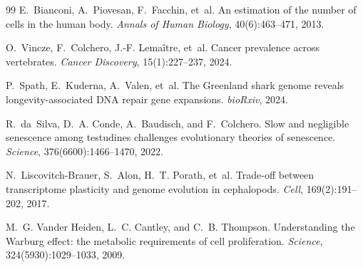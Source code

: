 \documentclass[11pt]{article}
\theoremstyle{definition}
\begin{document}
\begin{thebibliography}{99}
E.~Bianconi, A.~Piovesan, F.~Facchin, et~al.
\newblock An estimation of the number of cells in the human body.
\newblock \emph{Annals of Human Biology}, 40(6):463--471, 2013.

O.~Vincze, F.~Colchero, J.-F. Lema\^itre, et~al.
\newblock Cancer prevalence across vertebrates.
\newblock \emph{Cancer Discovery}, 15(1):227--237, 2024.

P.~Spath, E.~Kuderna, A.~Valen, et~al.
\newblock The Greenland shark genome reveals longevity-associated
DNA repair gene expansions.
\newblock \emph{bioRxiv}, 2024.

R.~da~Silva, D.~A. Conde, A.~Baudisch, and F.~Colchero.
\newblock Slow and negligible senescence among testudines challenges
evolutionary theories of senescence.
\newblock \emph{Science}, 376(6600):1466--1470, 2022.

N.~Liscovitch-Brauer, S.~Alon, H.~T. Porath, et~al.
\newblock Trade-off between transcriptome plasticity and genome evolution in
cephalopods.
\newblock \emph{Cell}, 169(2):191--202, 2017.

M.~G. {Vander Heiden}, L.~C. Cantley, and C.~B. Thompson.
\newblock Understanding the Warburg effect: the metabolic requirements of cell
proliferation.
\newblock \emph{Science}, 324(5930):1029--1033, 2009.

\end{thebibliography}
\end{document}
